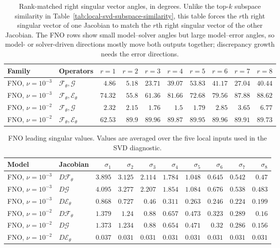 \documentclass[letterpaper]{article} %
\newcommand{\tabref}[1]{Table~\ref{#1}}
\begin{document}
\begin{table}[H]
\centering
\footnotesize
\caption{Rank-matched right singular vector angles, in degrees. Unlike the
top-$k$ subspace similarity in \tabref{tab:local-svd-subspace-similarity}, this
table forces the $r$th right singular vector of one Jacobian to match the $r$th
right singular vector of the other Jacobian. The FNO rows show small
model--solver angles but large model--error angles, so model- or solver-driven
directions mostly move both outputs together; discrepancy growth needs the
error directions.}
\label{tab:local-svd-rank-angles}
\setlength{\tabcolsep}{3pt}
\begin{tabular}{llrrrrrrrr}
\toprule
Family & Operators & $r=1$ & $r=2$ & $r=3$ & $r=4$ & $r=5$ & $r=6$ & $r=7$ & $r=8$ \\
\midrule
FNO, $\nu=10^{-3}$ & $\mathcal{F}_\theta,\mathcal{G}$ & $4.86$ & $5.18$ & $23.71$ & $39.07$ & $53.83$ & $41.17$ & $27.04$ & $40.44$ \\
FNO, $\nu=10^{-3}$ & $\mathcal{F}_\theta,\mathcal{E}_\theta$ & $74.32$ & $55.8$ & $61.36$ & $81.66$ & $72.68$ & $79.56$ & $87.88$ & $88.62$ \\
FNO, $\nu=10^{-2}$ & $\mathcal{F}_\theta,\mathcal{G}$ & $2.32$ & $2.15$ & $1.76$ & $1.5$ & $1.79$ & $2.85$ & $3.65$ & $6.77$ \\
FNO, $\nu=10^{-2}$ & $\mathcal{F}_\theta,\mathcal{E}_\theta$ & $62.53$ & $89.9$ & $89.96$ & $89.87$ & $89.95$ & $89.96$ & $89.91$ & $89.73$ \\
\bottomrule
\end{tabular}
\end{table}

\begin{table}[H]
\centering
\footnotesize
\caption{FNO leading singular values. Values are averaged over the five local
inputs used in the SVD diagnostic.}
\label{tab:local-svd-singular-values}
\setlength{\tabcolsep}{3pt}
\begin{tabular*}{\textwidth}{@{\extracolsep{\fill}}llrrrrrrrr@{}}
\toprule
Model & Jacobian & $\sigma_1$ & $\sigma_2$ & $\sigma_3$ & $\sigma_4$ & $\sigma_5$ & $\sigma_6$ & $\sigma_7$ & $\sigma_8$ \\
\midrule
FNO, $\nu=10^{-3}$ & $D\mathcal{F}_\theta$ & $3.895$ & $3.125$ & $2.114$ & $1.784$ & $1.048$ & $0.645$ & $0.542$ & $0.47$ \\
FNO, $\nu=10^{-3}$ & $D\mathcal{G}$ & $4.095$ & $3.277$ & $2.207$ & $1.854$ & $1.084$ & $0.676$ & $0.538$ & $0.483$ \\
FNO, $\nu=10^{-3}$ & $D\mathcal{E}_\theta$ & $0.868$ & $0.727$ & $0.46$ & $0.311$ & $0.263$ & $0.246$ & $0.224$ & $0.199$ \\
FNO, $\nu=10^{-2}$ & $D\mathcal{F}_\theta$ & $1.379$ & $1.24$ & $0.88$ & $0.657$ & $0.473$ & $0.323$ & $0.289$ & $0.16$ \\
FNO, $\nu=10^{-2}$ & $D\mathcal{G}$ & $1.373$ & $1.234$ & $0.88$ & $0.654$ & $0.471$ & $0.32$ & $0.286$ & $0.156$ \\
FNO, $\nu=10^{-2}$ & $D\mathcal{E}_\theta$ & $0.037$ & $0.031$ & $0.031$ & $0.031$ & $0.031$ & $0.031$ & $0.031$ & $0.031$ \\
\bottomrule
\end{tabular*}
\end{table}
\end{document}

